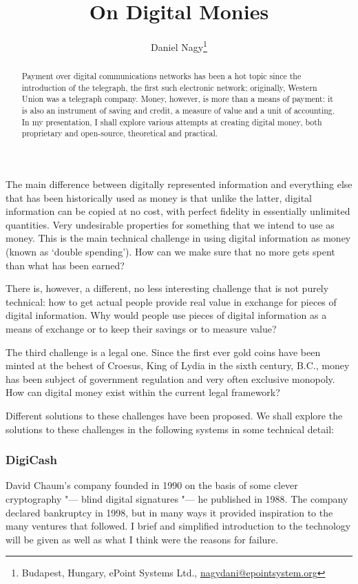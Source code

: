 \documentclass[10pt, a5paper]{article}
\begin{document}
\title{On Digital Monies}

\author{Daniel Nagy\footnote{Budapest, Hungary, ePoint Systems Ltd., \url{nagydani@epointsystem.org}}}
\date{}
\maketitle
\renewcommand{\abstractname}{Abstract}
\begin{abstract}
Payment over digital communications networks has been a hot topic since
the introduction of the telegraph, the first such elec\-tro\-nic network;
originally, Western Union was a telegraph com\-pa\-ny. Money, however, is
more than a means of payment: it is also an instrument of saving and
credit, a measure of value and a unit of accounting. In my presentation,
I shall explore various attempts at creating digital money, both
proprietary and open-source, theoretical and practical.
\end{abstract}

The main difference between digitally represented information and
everything else that has been historically used as money is that unlike
the latter, digital information can be copied at no cost, with perfect
fidelity in essentially unlimited quantities. Very undesirable
properties for something that we intend to use as money. This is the
main technical challenge in using digital information as money (known as
`double spending'). How can we make sure that no more gets spent than
what has been earned?

There is, however, a different, no less interesting challenge that is
not purely technical: how to get actual people provide real value in
exchange for pieces of digital information. Why would people use pieces
of digital information as a means of exchange or to keep their savings
or to measure value?

The third challenge is a legal one. Since the first ever gold coins have
been minted at the behest of Croesus, King of Lydia in the sixth
century, B.C., money has been subject of government regulation and very
often exclusive monopoly. How can digital money exist within the current
legal framework?

Different solutions to these challenges have been proposed. We shall
explore the solutions to these challenges in the following systems in
some technical detail:

\subsubsection*{DigiCash}
David Chaum's company founded in 1990 on the basis of some clever
cryptography "--- blind digital signatures "--- he published in 1988. The
company declared bankruptcy in 1998, but in many ways it provided
inspiration to the many ventures that followed. I brief and simplified
introduction to the technology will be given as well as what I think
were the reasons for failure.
\end{document}
